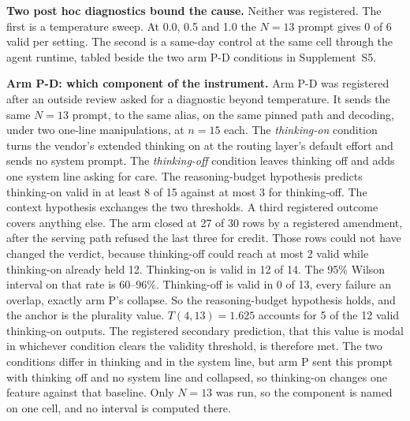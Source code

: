 \textbf{Two post hoc diagnostics bound the cause.} Neither was registered. The first is a
temperature sweep. At 0.0, 0.5 and 1.0 the $N = 13$ prompt gives 0 of 6 valid per setting. The
second is a same-day control at the same cell through the agent runtime, tabled beside the two
arm P-D conditions in Supplement~S5.

\textbf{Arm P-D: which component of the instrument.} Arm P-D was registered after an outside
review asked for a diagnostic beyond temperature. It sends the same $N = 13$ prompt, to the same alias, on the same pinned path and
decoding, under two one-line manipulations, at $n = 15$ each. The \emph{thinking-on}
condition turns the vendor's extended thinking on at the routing layer's default effort and
sends no system prompt. The \emph{thinking-off} condition leaves thinking off and adds one
system line asking for care. The reasoning-budget
hypothesis predicts thinking-on valid in at least 8 of 15 against at most 3 for thinking-off.
The context hypothesis exchanges the two thresholds. A third registered outcome covers
anything else. The arm closed at 27 of 30 rows by a registered amendment, after the serving
path refused the last three for credit. Those rows could not have changed the verdict,
because thinking-off could reach at most 2 valid while thinking-on already held 12.
Thinking-on is valid in 12 of 14. The 95\% Wilson interval on that rate is 60--96\%.
Thinking-off is valid in 0 of 13, every failure an overlap, exactly arm P's collapse. So the
reasoning-budget hypothesis holds, and the anchor is the plurality value. $T(4,13) = 1.625$
accounts for 5 of the 12 valid thinking-on outputs. The registered secondary prediction, that
this value is modal in whichever condition clears the validity threshold, is therefore met.
The two conditions differ in thinking and in the system line, but arm P sent this prompt with
thinking off and no system line and collapsed, so thinking-on changes one feature against that
baseline. Only $N = 13$ was run, so the component is named on one cell, and no interval is
computed there.
